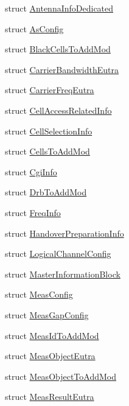 \begin{DoxyCompactItemize}
\item 
struct \hyperlink{structns3_1_1LteRrcSap_1_1AntennaInfoDedicated}{Antenna\+Info\+Dedicated}
\item 
struct \hyperlink{structns3_1_1LteRrcSap_1_1AsConfig}{As\+Config}
\item 
struct \hyperlink{structns3_1_1LteRrcSap_1_1BlackCellsToAddMod}{Black\+Cells\+To\+Add\+Mod}
\item 
struct \hyperlink{structns3_1_1LteRrcSap_1_1CarrierBandwidthEutra}{Carrier\+Bandwidth\+Eutra}
\item 
struct \hyperlink{structns3_1_1LteRrcSap_1_1CarrierFreqEutra}{Carrier\+Freq\+Eutra}
\item 
struct \hyperlink{structns3_1_1LteRrcSap_1_1CellAccessRelatedInfo}{Cell\+Access\+Related\+Info}
\item 
struct \hyperlink{structns3_1_1LteRrcSap_1_1CellSelectionInfo}{Cell\+Selection\+Info}
\item 
struct \hyperlink{structns3_1_1LteRrcSap_1_1CellsToAddMod}{Cells\+To\+Add\+Mod}
\item 
struct \hyperlink{structns3_1_1LteRrcSap_1_1CgiInfo}{Cgi\+Info}
\item 
struct \hyperlink{structns3_1_1LteRrcSap_1_1DrbToAddMod}{Drb\+To\+Add\+Mod}
\item 
struct \hyperlink{structns3_1_1LteRrcSap_1_1FreqInfo}{Freq\+Info}
\item 
struct \hyperlink{structns3_1_1LteRrcSap_1_1HandoverPreparationInfo}{Handover\+Preparation\+Info}
\item 
struct \hyperlink{structns3_1_1LteRrcSap_1_1LogicalChannelConfig}{Logical\+Channel\+Config}
\item 
struct \hyperlink{structns3_1_1LteRrcSap_1_1MasterInformationBlock}{Master\+Information\+Block}
\item 
struct \hyperlink{structns3_1_1LteRrcSap_1_1MeasConfig}{Meas\+Config}
\item 
struct \hyperlink{structns3_1_1LteRrcSap_1_1MeasGapConfig}{Meas\+Gap\+Config}
\item 
struct \hyperlink{structns3_1_1LteRrcSap_1_1MeasIdToAddMod}{Meas\+Id\+To\+Add\+Mod}
\item 
struct \hyperlink{structns3_1_1LteRrcSap_1_1MeasObjectEutra}{Meas\+Object\+Eutra}
\item 
struct \hyperlink{structns3_1_1LteRrcSap_1_1MeasObjectToAddMod}{Meas\+Object\+To\+Add\+Mod}
\item 
struct \hyperlink{structns3_1_1LteRrcSap_1_1MeasResultEutra}{Meas\+Result\+Eutra}

\end{DoxyCompactItemize}
